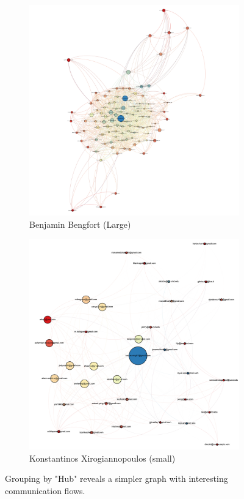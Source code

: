 \documentclass[11pt,letterpaper]{article}
\begin{document}
\begin{figure}[h]
	\centering
	\begin{subfigure}{0.49\textwidth}
		\centering
		\includegraphics[width=\textwidth]{figures/benjamin_simplification.png}
		\caption{\textsf{Benjamin Bengfort (Large)}}
        \label{fig:benjamin_simplification}
	\end{subfigure} \hfill
	\begin{subfigure}{0.49\textwidth}
		\centering
		\includegraphics[width=\textwidth]{figures/kostas_simplification.png}
		\caption{\textsf{Konstantinos Xirogiannopoulos (small)}}
        \label{fig:kostas_simplification}
	\end{subfigure}
    \caption{\textsf{Grouping by "Hub" reveals a simpler graph with interesting communication flows.}}
    \label{fig:simplification}
\end{figure}
\end{document}
